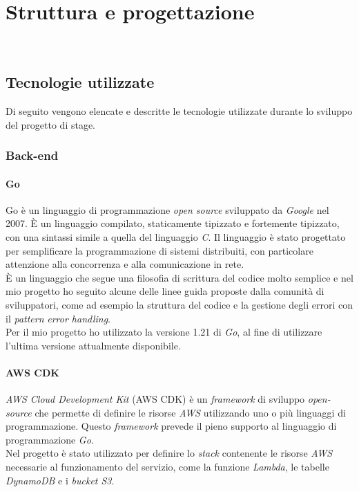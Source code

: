 \chapter{Struttura e progettazione}
\label{cap:struttura-progettazione}

\\

\section{Tecnologie utilizzate}

Di seguito vengono elencate e descritte le tecnologie utilizzate durante lo sviluppo del
progetto di stage.

\subsection{Back-end}

\subsubsection{Go}

Go è un linguaggio di programmazione \emph{open source} sviluppato da
\emph{Google} nel 2007. È un linguaggio compilato, staticamente tipizzato e
fortemente tipizzato, con una sintassi simile a quella del linguaggio \emph{C}.
Il linguaggio è stato progettato per semplificare la programmazione di sistemi
distribuiti, con particolare attenzione alla concorrenza e alla
comunicazione in rete. \\
È un linguaggio che segue una filosofia di scrittura del codice molto semplice e
nel mio progetto ho seguito alcune delle linee guida proposte dalla comunità di
sviluppatori, come ad esempio la struttura del codice e la gestione degli errori
con il \emph{pattern} \emph{error handling}. \\
Per il mio progetto ho utilizzato la versione 1.21 di \emph{Go}, al fine di
utilizzare l'ultima versione attualmente disponibile. \cite{go}

\subsubsection{AWS CDK}

\emph{AWS Cloud Development Kit} (AWS CDK) è un \emph{framework} di sviluppo
\emph{open-source} che permette di definire le risorse \emph{AWS} utilizzando
uno o più linguaggi di programmazione. Questo \emph{framework} prevede il pieno
supporto al linguaggio di programmazione \emph{Go}. \\
Nel progetto è stato utilizzato per definire lo \emph{stack} contenente le risorse \emph{AWS}
necessarie al funzionamento del servizio, come la funzione \emph{Lambda}, le
tabelle \emph{DynamoDB} e i \emph{bucket S3}. \cite{go-aws-cdk}

